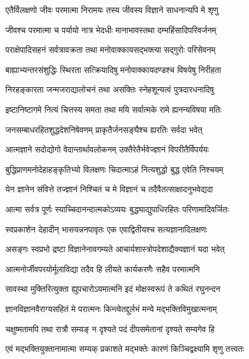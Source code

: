 \twolineshloka
{एतैर्विलक्षणो जीवः परमात्मा निरामयः}
{तस्य जीवस्य विज्ञाने साधनान्यपि मे शृणु} %

\twolineshloka
{जीवश्च परमात्मा च पर्यायो नात्र भेदधीः}
{मानाभावस्तथा दम्भहिंसादिपरिवर्जनम्} %

\twolineshloka
{पराक्षेपादिसहनं सर्वत्रावक्रता तथा}
{मनोवाक्कायसद्भक्त्या सद्गुरोः परिसेवनम्} %

\twolineshloka
{बाह्याभ्यन्तरसंशुद्धिः स्थिरता सत्क्रियादिषु}
{मनोवाक्कायदण्डश्च विषयेषु निरीहता} %

\twolineshloka
{निरहङ्कारता जन्मजराद्यालोचनं तथा}
{असक्तिः स्नेहशून्यत्वं पुत्रदारधनादिषु} %

\twolineshloka
{इष्टानिष्टागमे नित्यं चित्तस्य समता तथा}
{मयि सर्वात्मके रामे ह्यनन्यविषया मतिः} %

\twolineshloka
{जनसम्बाधरहितशुद्धदेशनिषेवणम्}
{प्राकृतैर्जनसङ्घैश्च ह्यरतिः सर्वदा भवेत्} %

\twolineshloka
{आत्मज्ञाने सदोद्योगो वेदान्तार्थावलोकनम्}
{उक्तैरेतैर्भवेज्ज्ञानं विपरीतैर्विपर्ययः} %

\twolineshloka
{बुद्धिप्राणमनोदेहाहङ्कृतिभ्यो विलक्षणः}
{चिदात्माऽहं नित्यशुद्धो बुद्ध एवेति निश्चयम्} %

\twolineshloka
{येन ज्ञानेन संवित्ते तज्ज्ञानं निश्चितं च मे}
{विज्ञानं च तदैवैतत्साक्षादनुभवेद्यदा} %

\twolineshloka
{आत्मा सर्वत्र पूर्णः स्याच्चिदानन्दात्मकोऽव्ययः}
{बुद्ध्याद्युपाधिरहितः परिणामादिवर्जितः} %

\twolineshloka
{स्वप्रकाशेन देहादीन् भासयन्ननपावृतः}
{एक एवाद्वितीयश्च सत्यज्ञानादिलक्षणः} %

\twolineshloka
{असङ्गः स्वप्रभो द्रष्टा विज्ञानेनावगम्यते}
{आचार्यशास्त्रोपदेशाद्यैक्यज्ञानं यदा भवेत्} %

\twolineshloka
{आत्मनोर्जीवपरयोर्मूलाविद्या तदैव हि}
{लीयते कार्यकरणैः सहैव परमात्मनि} %

\twolineshloka
{सावस्था मुक्तिरित्युक्ता ह्युपचारोऽयमात्मनि}
{इदं मोक्षस्वरूपं ते कथितं रघुनन्दन} %

\twolineshloka
{ज्ञानविज्ञानवैराग्यसहितं मे परात्मनः}
{किन्त्वेतद्दुर्लभं मन्ये मद्भक्तिविमुखात्मनाम्} %

\twolineshloka
{चक्षुष्मतामपि तथा रात्रौ सम्यङ् न दृश्यते}
{पदं दीपसमेतानां दृश्यते सम्यगेव हि} %

\twolineshloka
{एवं मद्भक्तियुक्तानामात्मा सम्यक् प्रकाशते}
{मद्भक्तेः कारणं किञ्चिद्वक्ष्यामि शृणु तत्त्वतः} %

